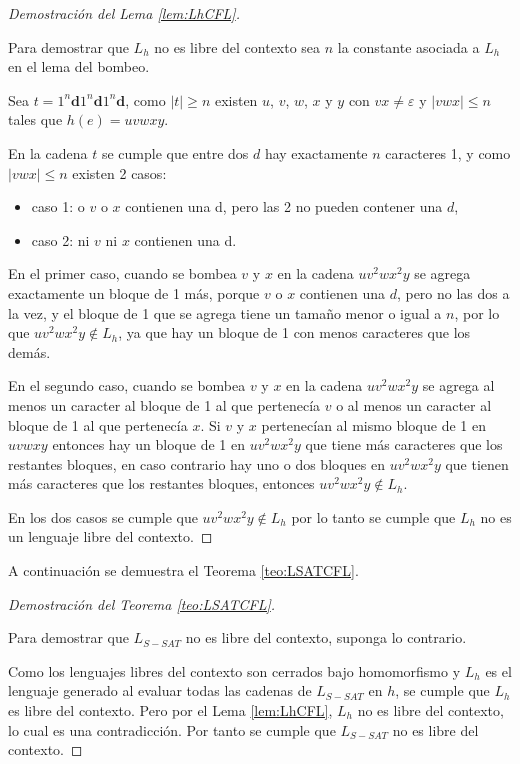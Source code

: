 \documentclass[12pt]{article}
\begin{document}
\begin{proof}[Demostración del Lema \ref{lem:LhCFL}] \
    
    Para demostrar que $L_h$ no es libre del contexto sea $n$ la constante asociada a $L_h$ en el lema del bombeo.
    
    Sea $t=1^n\mathbf{d}1^n\mathbf{d}1^n\mathbf{d}$, como $|t|\geq n$ existen $u$, $v$, $w$, $x$ y $y$ con $vx\neq \varepsilon$ y $|vwx|\leq n$
    tales que $h(e)=uvwxy$.
    
    En la cadena $t$ se cumple que entre dos $d$ hay exactamente $n$ caracteres 1, y como $|vwx|\leq n$ existen 2 casos: 
    \begin{itemize}
        \item caso 1: o $v$ o $x$ contienen una d, pero las 2 no pueden contener una $d$,
        \item caso 2: ni $v$ ni $x$ contienen una d.
    \end{itemize}
    
    
    En el primer caso, cuando se bombea $v$ y $x$ en la cadena $uv^2wx^2y$ se agrega exactamente un bloque de 1 más, porque $v$ o $x$ contienen una $d$, pero no las dos a la vez, y el bloque de 1
    que se agrega tiene un tamaño menor o igual a $n$, por lo que $uv^2wx^2y\notin L_h$, ya que hay un bloque de 1
    con menos caracteres que los demás.
    
    En el segundo caso, cuando se bombea $v$ y $x$ en la cadena $uv^2wx^2y$ se agrega al menos un caracter al bloque de 1 al que pertenecía 
    $v$ o al menos un caracter al bloque de 1 al que pertenecía $x$.  Si $v$ y $x$ pertenecían al mismo bloque 
    de 1 en $uvwxy$ entonces hay un bloque de 1 en $uv^2wx^2y$ que tiene más caracteres que los restantes 
    bloques, en caso contrario hay uno o dos bloques en $uv^2wx^2y$ que tienen más caracteres que los restantes 
    bloques, entonces $uv^2wx^2y\notin L_{h}$.
    
    En los dos casos se cumple que $uv^2wx^2y\notin L_h$ por lo tanto se cumple que $L_h$ no es un lenguaje libre del contexto.
\end{proof}

A continuación se demuestra el Teorema \ref{teo:LSATCFL}.

\begin{proof}[Demostración del Teorema \ref{teo:LSATCFL}] \
    
    Para demostrar que $L_{S-SAT}$ no es libre del contexto, suponga lo contrario. 
    
    Como los lenguajes libres del contexto
    son cerrados bajo homomorfismo y $L_h$ es el lenguaje generado al evaluar todas las cadenas de $L_{S-SAT}$ en $h$, se cumple
    que $L_h$ es libre del contexto. Pero por el Lema \ref{lem:LhCFL}, $L_h$ no es libre del contexto, lo cual es una contradicción.
    Por tanto se cumple que $L_{S-SAT}$ no es libre del contexto.
\end{proof}
\end{document}
